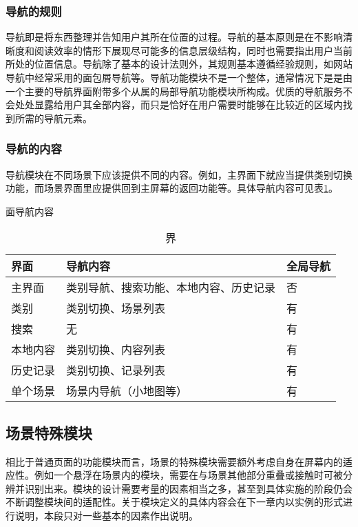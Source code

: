 \subsubsection{导航的规则}
导航即是将东西整理并告知用户其所在位置的过程。导航的基本原则是在不影响清晰度和阅读效率的情形下展现尽可能多的信息层级结构，同时也需要指出用户当前所处的位置信息。导航除了基本的设计法则外，其规则基本遵循经验规则，如网站导航中经常采用的面包屑导航等。导航功能模块不是一个整体，通常情况下是是由一个主要的导航界面附带多个从属的局部导航功能模块所构成。优质的导航服务不会处处显露给用户其全部内容，而只是恰好在用户需要时能够在比较近的区域内找到所需的导航元素。

\subsubsection{导航的内容}
导航模块在不同场景下应该提供不同的内容。例如，主界面下就应当提供类别切换功能，而场景界面里应提供回到主屏幕的返回功能等。具体导航内容可见表\ref{tab:nav}。

\begin{table}[htbp]
\centering
\caption 界面导航内容
\vskip 5pt
\begin{tabular}{lll}
\toprule
界面 & 导航内容 & 全局导航\\
\midrule
主界面 & 类别导航、搜索功能、本地内容、历史记录 & 否\\
类别 & 类别切换、场景列表 & 有 \\
搜索 & 无 & 有 \\
本地内容 & 类别切换、内容列表 & 有 \\
历史记录 & 类别切换、记录列表 & 有 \\
单个场景 & 场景内导航（小地图等） & 有 \\
\bottomrule
\end{tabular}
\label{tab:nav}
\end{table}

\subsection{场景特殊模块}
相比于普通页面的功能模块而言，场景的特殊模块需要额外考虑自身在屏幕内的适应性。例如一个悬浮在场景内的模块，需要在与场景其他部分重叠或接触时可被分辨并识别出来。模块的设计需要考量的因素相当之多，甚至到具体实施的阶段仍会不断调整模块间的适配性。关于模块定义的具体内容会在下一章内以实例的形式进行说明，本段只对一些基本的因素作出说明。

